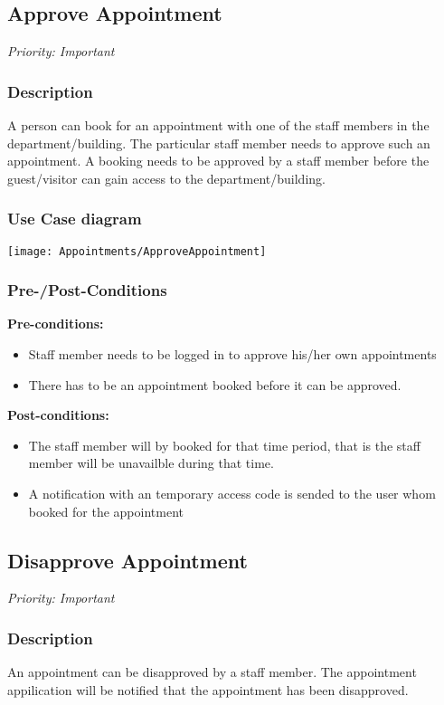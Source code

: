\subsection{Approve Appointment}
\textit{Priority: Important} \\

\subsubsection{Description}
A person can book for an appointment with one of the staff members in the department/building. The particular staff member needs to approve such an appointment. A booking needs to be approved by a staff member before the guest/visitor can gain access to the department/building.

\subsubsection{Use Case diagram}
\texttt{[image: Appointments/ApproveAppointment]}

\subsubsection{Pre-/Post-Conditions}
\textbf{Pre-conditions:} 
	\begin{itemize}
		\item Staff member needs to be logged in to approve his/her own appointments
		\item There has to be an appointment booked before it can be approved.
	\end{itemize}
\textbf{ Post-conditions:} 
	\begin{itemize}
		\item The staff member will by booked for that time period, that is the staff member will be unavailble during that time.
		\item A notification with an temporary access code is sended to the user whom booked for the appointment
	\end{itemize}

\subsection{Disapprove Appointment}
\textit{Priority: Important} \\

\subsubsection{Description}
An appointment can be disapproved by a staff member. The appointment appilication will be notified that the appointment has been disapproved. 

